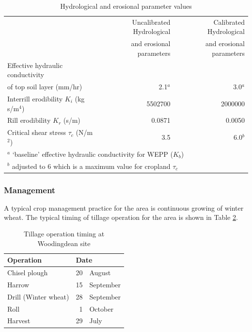 \begin{table}[htbp]
  \centering
  \caption[Hydrological and erosional parameter values]{Hydrological and
erosional parameter values \citep[After][]{favis-mortlock1998-141}}
  \label{tab:HydrologicalAndErosionalParameters}
    \small
    \begin{tabular}{lrr}
    \toprule
    & Uncalibrated Hydrological & Calibrated Hydrological\\
    & and erosional parameters & and erosional parameters\\
    \midrule
    Effective hydraulic conductivity & &\\
    of top soil layer (mm/hr) & 2.1$^a$ & 3.0$^a$\\
    Interrill erodibility $K_i$ (kg s/m$^4$) & 5502700 & 2000000\\
    Rill erodibility $K_r$ (s/m) & 0.0871 & 0.0050\\
    Critical shear stress $\tau_c$ (N/m$^2$) & 3.5 & 6.0$^b$\\
    \bottomrule
    \multicolumn{3}{l}{\footnotesize $^a$ `baseline' effective
hydraulic conductivity for WEPP ($K_b$)}\\
    \multicolumn{3}{l}{\footnotesize $^b$ adjusted to 6 which is a
maximum value for cropland $\tau_c$}
    \end{tabular}
\end{table}

\subsubsection{Management}
\label{sec:Management}
A typical crop management practice for the area is continuous growing of winter
wheat. The typical timing of tillage operation for the area is shown in Table
\ref{tab:TillageOperationTiming}.

\begin{table}[htbp]
  \centering
  \caption[Tillage operation timing at Woodingdean site]{Tillage operation
timing at Woodingdean site \citep[From][]{favis-mortlock1998-141}}
  \label{tab:TillageOperationTiming}
    \small
    \begin{tabular}{lr@{ }l}
      \toprule
      \textbf{Operation} & \multicolumn{2}{l}{\textbf{Date}}\\
      \midrule
      Chisel plough & 20 & August\\
      Harrow & 15 & September\\
      Drill (Winter wheat) & 28 & September\\
      Roll & 1 & October\\
      Harvest & 29 & July\\
      \bottomrule
    \end{tabular}
\end{table}

